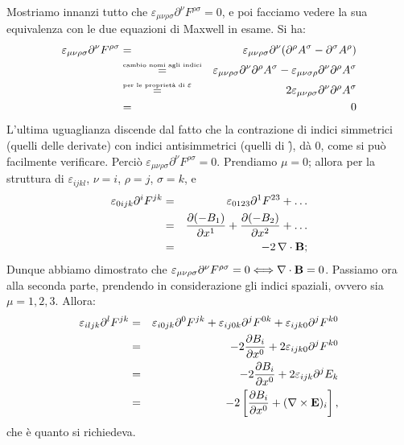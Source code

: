 \begin{dimostrazione}
  Mostriamo innanzi tutto che $ \varepsilon_{\mu\nu\rho\sigma}
  \partial^{\nu} F^{\rho\sigma} = 0 $, e poi facciamo vedere la sua
  equivalenza con le due equazioni di Maxwell in esame. Si ha:
  \begin{eqnarray*}
    \varepsilon_{\mu\nu\rho\sigma}
    \partial^{\nu} F^{\rho\sigma} & = & \varepsilon_{\mu\nu\rho\sigma}
    \partial^{\nu}(\partial^{\rho}A^{\sigma} - \partial^{\sigma}A^{\rho}) \\
    & \stackrel{\mbox{\tiny cambio nomi agli indici}}{=} &
    \varepsilon_{\mu\nu\rho\sigma}
    \partial^{\nu}
    \partial^{\rho} A^{\sigma} - \varepsilon_{\mu\nu\sigma\rho} \partial^{\nu}
    \partial^{\rho} A^{\sigma} \\
    & \stackrel{\mbox{\tiny per le propriet\`a di } \varepsilon}{=} &
    2 \varepsilon_{\mu\nu\rho\sigma}
    \partial^{\nu}
    \partial^{\rho} A^{\sigma}\\
    & = & 0
  \end{eqnarray*}
  L'ultima uguaglianza discende dal fatto che la contrazione di indici
  simmetrici (quelli delle derivate) con indici antisimmetrici (quelli
  di \f), d\`a 0, come si pu\`o facilmente verificare. Perci\`o
  $\varepsilon_{\mu\nu\rho\sigma}
  \partial^{\nu} F^{\rho\sigma} = 0$. Prendiamo $\mu = 0$; allora per
  la struttura di $\varepsilon_{ijkl}$, $\nu = i$, $\rho = j$, $\sigma
  = k$, e
  \begin{eqnarray*}
    \varepsilon_{0ijk} \partial^i F^{jk} & = & \varepsilon_{0123}
    \partial^1 F^{23} + \ldots\\
    & = & \frac{\partial ( -B_1 )}{\partial x^1} + \frac{\partial (
      -B_2 )}{\partial x^2} + \ldots \\
    & = & -2 \, \mathbf{\nabla \cdot B};
  \end{eqnarray*}
  Dunque abbiamo dimostrato che $\varepsilon_{\mu\nu\rho\sigma}
  \partial^{\nu} F^{\rho\sigma} = 0 \Longleftrightarrow \mathbf{\nabla
    \cdot B} = 0$. Passiamo ora alla seconda parte, prendendo in
  considerazione gli indici spaziali, ovvero sia $ \mu = 1,2,3 $.
  Allora:
  \begin{eqnarray*}
    \varepsilon_{iljk} \partial^l F^{jk} & = & \varepsilon_{i0jk}
    \partial^0 F^{jk} + \varepsilon_{ij0k}
    \partial^j F^{0k} + \varepsilon_{ijk0}
    \partial^j F^{k0} \\
    & = & - 2 \frac{\partial B_i}{\partial x^0} + 2 \varepsilon_{ijk0}
    \partial^j F^{k0} \\
    & = & - 2 \frac{\partial B_i}{\partial x^0} + 2
    \varepsilon_{ijk}\partial^j E_k \\
    & = & -2 \left[\frac{\partial B_i}{\partial x^0} + (\mathbf{\nabla
        \times E})_i \right],
  \end{eqnarray*}
  che \`e quanto si richiedeva.
\end{dimostrazione}
